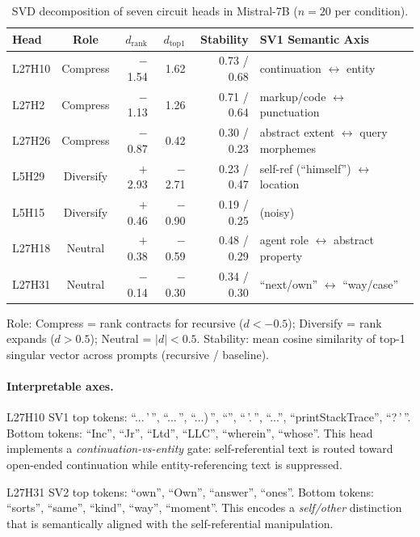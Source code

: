 \documentclass{article}
\newcommand{\dcohen}{d}
\begin{document}
\begin{table}[h]
\centering
\caption{SVD decomposition of seven circuit heads in Mistral-7B ($n{=}20$ per condition).}
\label{tab:svd_heads}
\small
\begin{tabular}{lcrrrl}
\toprule
Head & Role & $\dcohen_{\text{rank}}$ & $\dcohen_{\text{top1}}$ & Stability & SV1 Semantic Axis \\
\midrule
L27H10 & Compress & $-$1.54 & 1.62 & 0.73 / 0.68 & continuation $\leftrightarrow$ entity \\
L27H2  & Compress & $-$1.13 & 1.26 & 0.71 / 0.64 & markup/code $\leftrightarrow$ punctuation \\
L27H26 & Compress & $-$0.87 & 0.42 & 0.30 / 0.23 & abstract extent $\leftrightarrow$ query morphemes \\
L5H29  & Diversify & $+$2.93 & $-$2.71 & 0.23 / 0.47 & self-ref (``himself'') $\leftrightarrow$ location \\
L5H15  & Diversify & $+$0.46 & $-$0.90 & 0.19 / 0.25 & (noisy) \\
L27H18 & Neutral & $+$0.38 & $-$0.59 & 0.48 / 0.29 & agent role $\leftrightarrow$ abstract property \\
L27H31 & Neutral & $-$0.14 & $-$0.30 & 0.34 / 0.30 & ``next/own'' $\leftrightarrow$ ``way/case'' \\
\bottomrule
\end{tabular}
\vspace{1mm}

\raggedright\footnotesize
Role: Compress = rank contracts for recursive ($\dcohen < -0.5$); Diversify = rank expands ($\dcohen > 0.5$); Neutral = $|\dcohen| < 0.5$.
Stability: mean cosine similarity of top-1 singular vector across prompts (recursive / baseline).
\end{table}

\paragraph{Interpretable axes.}
L27H10 SV1 top tokens: ``...\,'\,'', ``...\,\textquotedbl'', ``...)\,'', ``\textquotedbl'', ``\,'.\,'', ``...'', ``printStackTrace'', ``?\,'\,''.
Bottom tokens: ``Inc'', ``Jr'', ``Ltd'', ``LLC'', ``wherein'', ``whose''.
This head implements a \emph{continuation-vs-entity} gate: self-referential text is routed toward open-ended continuation while entity-referencing text is suppressed.

L27H31 SV2 top tokens: ``own'', ``Own'', ``answer'', ``ones''.
Bottom tokens: ``sorts'', ``same'', ``kind'', ``way'', ``moment''.
This encodes a \emph{self/other} distinction that is semantically aligned with the self-referential manipulation.
\end{document}
